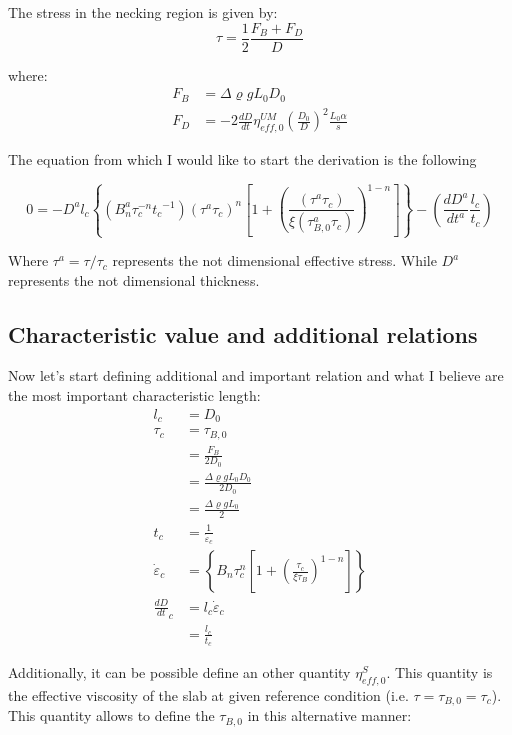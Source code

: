 \documentclass{article}
\begin{document}
The stress in the necking region is given by:
\begin{equation}
    \tau = \frac{1}{2}\frac{F_B+F_D}{D}
\label{eq:effective_stress0}
\end{equation}

where: 
\begin{align}
    F_B &= \Delta \varrho g L_0 D_0 \\ 
    F_D &= -2\frac{dD}{dt}\eta^{UM}_{eff,0}\left(\frac{D_0}{D}\right)^2\frac{L_0 \alpha}{s}
    \label{eq:Drag_Force}
\end{align}

The equation from which I would like to start the derivation is the following

\begin{equation}
    0 = -D^{a} l_c \left\{ (B_n^{a} \tau_c^{-n}{t_c}^{-1})  \left(\tau^{a}\tau_c\right)^n \left[ 1+ \left( \frac{\left(\tau^{a}\tau_c\right)}{\xi (\tau^{a}_{B,0}\tau_c)} \right)^{1-n} \right] \right\} -\left(\frac{dD^{a}}{dt^{a}}\frac{l_c}{t_c}\right)
  \label{eq:Main_equation}
\end{equation}

Where $\tau^{a}= \tau/\tau_c$ represents the not dimensional effective stress. While $D^{a}$ represents the not dimensional thickness. 
\subsection{Characteristic value and additional relations}
Now let's start defining additional and important relation and what I believe are the most important characteristic length: 
\begin{align}
    l_c &= D_0 \\ 
    \tau_c &= \tau_{B,0}\\
    &= \frac{F_B}{2D_0} \\ 
    &= \frac{\Delta \varrho g L_0 D_0}{2 D_0} \\ 
    &= \frac{\Delta \varrho g L_0}{2}\\
    t_c &= \frac{1}{\dot{\varepsilon}_c} \\
    \dot{\varepsilon}_c &= \left\{ B_n \tau_c^n \left[ 1+ \left( \frac{\tau_c}{\xi \tau_B} \right)^{1-n} \right] \right\}\\
     \frac{dD}{dt}_{c} &= l_c \dot{\varepsilon}_c\\
     &= \frac{l_c}{t_c}
\end{align}

Additionally, it can be possible define an other quantity $\eta^S_{eff,0}$. This quantity is the effective viscosity of the slab at given reference condition (i.e. $\tau=\tau_{B,0}=\tau_c$). This quantity allows to define the $\tau_{B,0}$ in this alternative manner:
\end{document}
